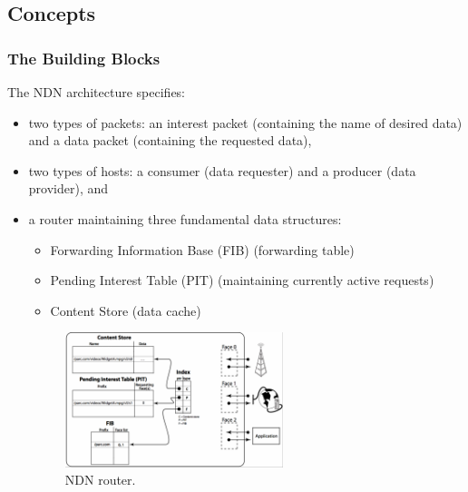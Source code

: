         \subsection{Concepts}

            \subsubsection{The Building Blocks}

                The NDN architecture specifies:
                    \begin{itemize}
                        \item two types of packets: an interest packet (containing the name of desired data) and a data packet (containing the requested data),
                        \item two types of hosts: a consumer (data requester) and a producer (data provider), and
                        \item a router maintaining three fundamental data structures:
                        \begin{itemize}
                            \item Forwarding Information Base (FIB) (forwarding table)
                            \item Pending Interest Table (PIT) (maintaining currently active requests)
                            \item Content Store (data cache)
                        \end{itemize}
                        \begin{figure}[H]
                            \begin{center}
                                \includegraphics[width=0.6\textwidth]{fig/archs_ndn-router.png}
                              \caption{NDN router.}
                              \label{fig:ndn-router}
                            \end{center}
                        \end{figure}

                    \end{itemize}

